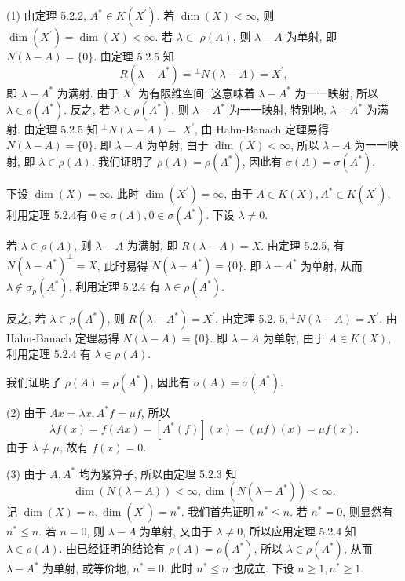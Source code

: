 \documentclass[openany]{ctexbook}
\makeatletter
\theoremstyle{kaiti}
\theoremstyle{normal}
\renewenvironment{proof}[1][\proofname]{\par
    \pushQED{\qed}%
    \normalfont \topsep6\p@\@plus6\p@\relax
    \trivlist
    \item\relax
    {\heiti #1}\hspace{2\labelsep}\ignorespaces
  }{%
    \popQED\endtrivlist\@endpefalse
  }
\makeatother
\begin{document}
\begin{proof}
(1) 由定理 5.2.2, $A^{*} \in K\left(X^{\prime}\right)$. 若 $\operatorname{dim}(X)<\infty$, 则 $\operatorname{dim}\left(X^{\prime}\right)=\operatorname{dim}(X)<\infty$. 若 $\lambda \in$ $\rho(A)$, 则 $\lambda-A$ 为单射, 即 $N(\lambda-A)=\{0\}$. 由定理 5.2.5 知
$$
R\left(\lambda-A^{*}\right)={ }^{\perp} N(\lambda-A)=X^{\prime},
$$
即 $\lambda-A^{*}$ 为满射. 由于 $X^{\prime}$ 为有限维空间, 这意味着 $\lambda-A^{*}$ 为一一映射, 所以 $\lambda \in \rho\left(A^{*}\right)$. 反之, 若 $\lambda \in \rho\left(A^{*}\right)$, 则 $\lambda-A^{*}$ 为一一映射, 特别地, $\lambda-A^{*}$ 为满射. 由定理 5.2.5 知 $^{\perp} N(\lambda-A)=$ $X^{\prime}$, 由 Hahn-Banach 定理易得 $N(\lambda-A)=\{0\}$. 即 $\lambda-A$ 为单射, 由于 $\operatorname{dim}(X)<\infty$, 所以 $\lambda-A$ 为一一映射, 即 $\lambda \in \rho(A)$. 我们证明了 $\rho(A)=\rho\left(A^{*}\right)$, 因此有 $\sigma(A)=\sigma\left(A^{*}\right)$.

下设 $\operatorname{dim}(X)=\infty$. 此时 $\operatorname{dim}\left(X^{\prime}\right)=\infty$, 由于 $A \in K(X), A^{*} \in K\left(X^{\prime}\right)$, 利用定理 5.2.4有 $0 \in \sigma(A), 0 \in \sigma\left(A^{*}\right)$. 下设 $\lambda \neq 0$.

若 $\lambda \in \rho(A)$, 则 $\lambda-A$ 为满射, 即 $R(\lambda-A)=X$. 由定理 5.2.5, 有 $N\left(\lambda-A^{*}\right)^{\perp}=X$, 此时易得 $N\left(\lambda-A^{*}\right)=\{0\}$. 即 $\lambda-A^{*}$ 为单射, 从而 $\lambda \notin \sigma_{p}\left(A^{*}\right)$, 利用定理 5.2.4 有 $\lambda \in \rho\left(A^{*}\right)$.

反之, 若 $\lambda \in \rho\left(A^{*}\right)$, 则 $R\left(\lambda-A^{*}\right)=X^{\prime}$. 由定理 5.2. $5,{ }^{\perp} N(\lambda-A)=X^{\prime}$, 由 Hahn-Banach 定理易得 $N(\lambda-A)=\{0\}$. 即 $\lambda-A$ 为单射, 由于 $A \in K(X)$, 利用定理 5.2.4 有 $\lambda \in \rho(A)$.

我们证明了 $\rho(A)=\rho\left(A^{*}\right)$, 因此有 $\sigma(A)=\sigma\left(A^{*}\right)$.

(2) 由于 $A x=\lambda x, A^{*} f=\mu f$, 所以
$$
\lambda f(x)=f(A x)=\left[A^{*}(f)\right](x)=(\mu f)(x)=\mu f(x).
$$
由于 $\lambda \neq \mu$, 故有 $f(x)=0$.

(3) 由于 $A, A^{*}$ 均为紧算子, 所以由定理 5.2.3 知
$$
\operatorname{dim}(N(\lambda-A))<\infty, \operatorname{dim}\left(N\left(\lambda-A^{*}\right)\right)<\infty.
$$
记 $\operatorname{dim}(X)=n, \operatorname{dim}\left(X^{\prime}\right)=n^{*}$. 我们首先证明 $n^{*} \leqslant n$. 若 $n^{*}=0$, 则显然有 $n^{*} \leqslant n$. 若 $n=0$, 则 $\lambda-A$ 为单射, 又由于 $\lambda \neq 0$, 所以应用定理 5.2.4 知 $\lambda \in \rho(A)$. 由已经证明的结论有 $\rho(A)=\rho\left(A^{*}\right)$, 所以 $\lambda \in \rho\left(A^{*}\right)$, 从而 $\lambda-A^{*}$ 为单射, 或等价地, $n^{*}=0$. 此时 $n^{*} \leqslant n$ 也成立. 下设 $n \geqslant 1, n^{*} \geqslant 1$.


\end{proof}
\end{document}
